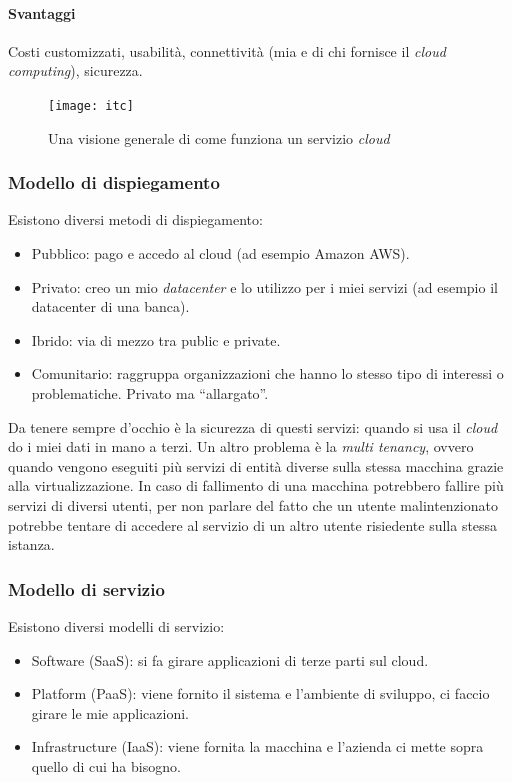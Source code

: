 \paragraph*{Svantaggi} Costi customizzati, usabilità, connettività (mia e di 
chi fornisce il \textit{cloud computing}), sicurezza.


\begin{figure}[H]
 \centering
 \texttt{[image: itc]}
 \caption{Una visione generale di come funziona un servizio \textit{cloud}}
\end{figure}

\subsubsection{Modello di dispiegamento}

Esistono diversi metodi di dispiegamento:
\begin{itemize}
  \item Pubblico: pago e accedo al cloud (ad esempio Amazon AWS).
  
  \item Privato: creo un mio \textit{datacenter} e lo utilizzo per i miei 
  servizi (ad esempio il datacenter di una banca).
  
  \item Ibrido: via di mezzo tra public e private.
  
  \item Comunitario: raggruppa organizzazioni che hanno lo stesso tipo di 
  interessi o problematiche. Privato ma ``allargato''.
  
\end{itemize}

Da tenere sempre d'occhio è la sicurezza di questi servizi: quando si usa il 
\textit{cloud} do i miei dati in mano a terzi. Un altro problema è la 
\textit{multi tenancy}, ovvero quando vengono eseguiti più servizi di entità 
diverse sulla stessa macchina grazie alla virtualizzazione. In caso di 
fallimento di una macchina potrebbero fallire più servizi di diversi utenti, 
per non parlare del fatto che un utente malintenzionato potrebbe tentare di 
accedere al servizio di un altro utente risiedente sulla stessa istanza.

\subsubsection{Modello di servizio}

Esistono diversi modelli di servizio:
\begin{itemize}
  \item Software (SaaS): si fa girare applicazioni di terze parti sul cloud.
  \item Platform (PaaS): viene fornito il sistema e l'ambiente di sviluppo, ci 
  faccio girare le mie applicazioni. 
  \item Infrastructure (IaaS): viene fornita la macchina e l'azienda ci mette 
  sopra quello di cui ha bisogno.
  
\end{itemize}

